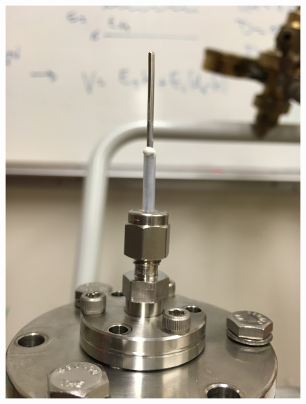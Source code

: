 \begin{figure}[htbp]
\begin{minipage}{0.47\textwidth}
    \includegraphics[width=\linewidth]{figures/testbed/ft5_2.jpg}
    \end{minipage}

    \vspace*{1cm} %


\end{figure}
